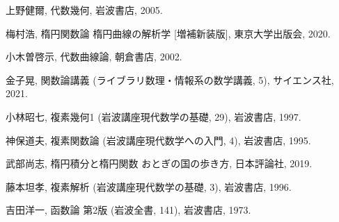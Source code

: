 \documentclass[11pt, a4paper, dvipdfmx, draft]{jsarticle}
\theoremstyle{definition}
\theoremstyle{mystyle}
\numberwithin{equation}{section} %
\begin{document}
\begin{thebibliography}{15}

     上野健爾, 代数幾何, 岩波書店, 2005.

     梅村浩, 楕円関数論 楕円曲線の解析学 [増補新装版], 東京大学出版会, 2020.

     小木曽啓示, 代数曲線論, 朝倉書店, 2002.

     金子晃, 関数論講義 (ライブラリ数理・情報系の数学講義, 5), サイエンス社, 2021.

     小林昭七, 複素幾何1 (岩波講座現代数学の基礎, 29), 岩波書店, 1997.

     神保道夫, 複素関数論 (岩波講座現代数学への入門, 4), 岩波書店, 1995.

     武部尚志, 楕円積分と楕円関数 おとぎの国の歩き方, 日本評論社, 2019.

     藤本坦孝, 複素解析 (岩波講座現代数学の基礎, 3), 岩波書店, 1996.

     吉田洋一, 函数論 第2版 (岩波全書, 141), 岩波書店, 1973.


\end{thebibliography}
\end{document}
